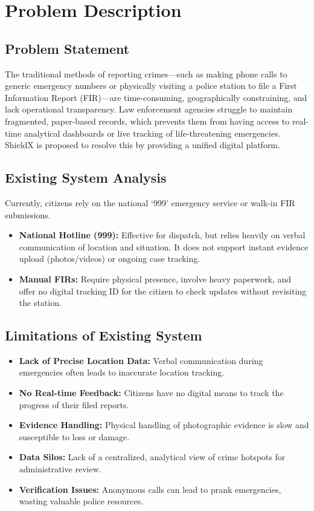 \documentclass[11pt, a4paper]{report}
\begin{document}
\chapter{Problem Description}

\section{Problem Statement}
The traditional methods of reporting crimes---such as making phone calls to generic emergency numbers or physically visiting a police station to file a First Information Report (FIR)---are time-consuming, geographically constraining, and lack operational transparency. Law enforcement agencies struggle to maintain fragmented, paper-based records, which prevents them from having access to real-time analytical dashboards or live tracking of life-threatening emergencies. ShieldX is proposed to resolve this by providing a unified digital platform.

\section{Existing System Analysis}
Currently, citizens rely on the national `999' emergency service or walk-in FIR submissions. 
\begin{itemize}
    \item \textbf{National Hotline (999):} Effective for dispatch, but relies heavily on verbal communication of location and situation. It does not support instant evidence upload (photos/videos) or ongoing case tracking.
    \item \textbf{Manual FIRs:} Require physical presence, involve heavy paperwork, and offer no digital tracking ID for the citizen to check updates without revisiting the station.
\end{itemize}

\section{Limitations of Existing System}
\begin{itemize}
    \item \textbf{Lack of Precise Location Data:} Verbal communication during emergencies often leads to inaccurate location tracking.
    \item \textbf{No Real-time Feedback:} Citizens have no digital means to track the progress of their filed reports.
    \item \textbf{Evidence Handling:} Physical handling of photographic evidence is slow and susceptible to loss or damage.
    \item \textbf{Data Silos:} Lack of a centralized, analytical view of crime hotspots for administrative review.
    \item \textbf{Verification Issues:} Anonymous calls can lead to prank emergencies, wasting valuable police resources.
\end{itemize}
\end{document}
